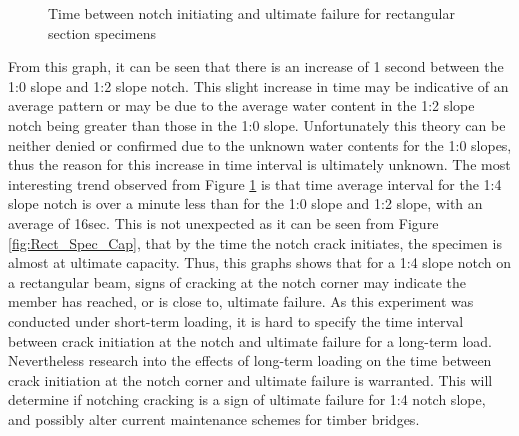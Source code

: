 \documentclass[11pt,a4paper]{article}
\numberwithin{equation}{subsection}
\begin{document}
\vspace*{\baselineskip}

\begin{figure}[h]
	\begin{center}
	\end{center}
	\caption{Time between notch initiating and ultimate failure for rectangular section specimens}
	\label{fig:Rect_Time}
\end{figure}

\noindent
From this graph, it can be seen that there is an increase of 1 second between the 1:0 slope and 1:2 slope notch. This slight increase in time may be indicative of an average pattern or may be due to the average water content in the 1:2 slope notch being greater than those in the 1:0 slope. Unfortunately this theory can be neither denied or confirmed due to the unknown water contents for the 1:0 slopes, thus the reason for this increase in time interval is ultimately unknown. The most interesting trend observed from Figure \ref{fig:Rect_Time} is that time average interval for the 1:4 slope notch is over a minute less than for the 1:0 slope and 1:2 slope, with an average of 16sec. This is not unexpected as it can be seen from Figure \ref{fig:Rect_Spec_Cap}, that by the time the notch crack initiates, the specimen is almost at ultimate capacity. Thus, this graphs shows that for a 1:4 slope notch on a rectangular beam, signs of cracking at the notch corner may indicate the member has reached, or is close to, ultimate failure. As this experiment was conducted under short-term loading, it is hard to specify the time interval between crack initiation at the notch and ultimate failure for a long-term load. Nevertheless research into the effects of long-term loading on the time between crack initiation at the notch corner and ultimate failure is warranted. This will determine if notching cracking is a sign of ultimate failure for 1:4 notch slope, and possibly alter current maintenance schemes for timber bridges.
\end{document}
